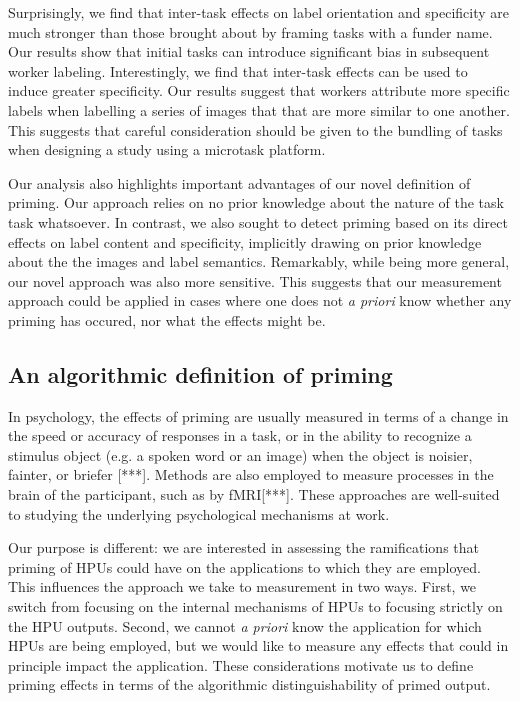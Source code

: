 \documentclass[a4paper]{report}
\begin{document}
Surprisingly, we find that inter-task effects on label orientation and 
specificity are much stronger than those brought about by framing tasks with a 
funder name.  Our results show that initial tasks can introduce significant 
bias in subsequent worker labeling.  Interestingly, we find that inter-task
effects can be used to induce greater specificity.  Our results suggest that
workers attribute more specific labels when labelling a series of images that
that are more similar to one another.  This suggests that careful 
consideration should be given to the bundling of tasks when designing a study 
using a microtask platform.

Our analysis also highlights important advantages of our novel definition of 
priming.  Our approach relies on no prior knowledge about the nature
of the task task whatsoever.  In contrast, we also sought to detect priming
based on its direct effects on label content and specificity, implicitly
drawing on prior knowledge about the the images and label semantics.
Remarkably, while being more general, our novel approach was also more 
sensitive.  This suggests that our measurement approach could be applied in 
cases where one does not \emph{a priori} know whether any priming has occured, 
nor what the effects might be.

\subsection*{An algorithmic definition of priming}

In psychology, the effects of priming are usually measured in terms of a 
change in the  
speed or accuracy of responses in a task, or in the ability to recognize a 
stimulus object (e.g. a spoken word or an image) when the object is noisier, 
fainter, or briefer [***].  Methods are also employed to measure processes
in the brain of the participant, such as by fMRI[***].  These approaches are 
well-suited to studying the underlying psychological mechanisms at work.

Our purpose is different: we are interested in assessing the ramifications
that priming of HPUs could have on the applications to which they are employed.
This influences the approach we take to measurement in two ways.  First, we 
switch from focusing on the internal mechanisms of HPUs to focusing strictly 
on the HPU outputs.  Second, we cannot \textit{a priori} know the 
application for which HPUs are being employed, but we would like to measure 
any effects that could in principle impact the application.  These 
considerations motivate us to define priming effects in terms of the 
algorithmic distinguishability of primed output.
\end{document}
